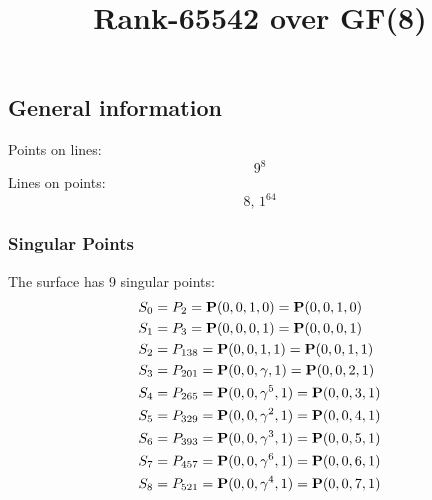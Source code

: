 \documentclass{article}
\newcommand\setTBstruts{\def\T{\rule{0pt}{2.6ex}}%
\def\B{\rule[-1.2ex]{0pt}{0pt}}}
\newcommand{\bP}{{\bf P}}
\begin{document}
 
\setTBstruts



{\allowdisplaybreaks%






\title{Rank-65542 over GF(8)}
\author{}%
\maketitle%
%
{}



\subsection*{General information}
Points on lines:
$$
9^8$$
Lines on points:
$$
8,\,1^{64}$$
\subsubsection*{Singular Points}
The surface has 9 singular points:\\
\begin{align*}
S_{0} &= P_{2}=\bP(0, 0, 1, 0) = \bP(0, 0, 1, 0)\\
S_{1} &= P_{3}=\bP(0, 0, 0, 1) = \bP(0, 0, 0, 1)\\
S_{2} &= P_{138}=\bP(0, 0, 1, 1) = \bP(0, 0, 1, 1)\\
S_{3} &= P_{201}=\bP(0, 0, \gamma , 1) = \bP(0, 0, 2, 1)\\
S_{4} &= P_{265}=\bP(0, 0, \gamma^{5}, 1) = \bP(0, 0, 3, 1)\\
S_{5} &= P_{329}=\bP(0, 0, \gamma^{2}, 1) = \bP(0, 0, 4, 1)\\
S_{6} &= P_{393}=\bP(0, 0, \gamma^{3}, 1) = \bP(0, 0, 5, 1)\\
S_{7} &= P_{457}=\bP(0, 0, \gamma^{6}, 1) = \bP(0, 0, 6, 1)\\
S_{8} &= P_{521}=\bP(0, 0, \gamma^{4}, 1) = \bP(0, 0, 7, 1)\\
\end{align*}
}
\end{document}

